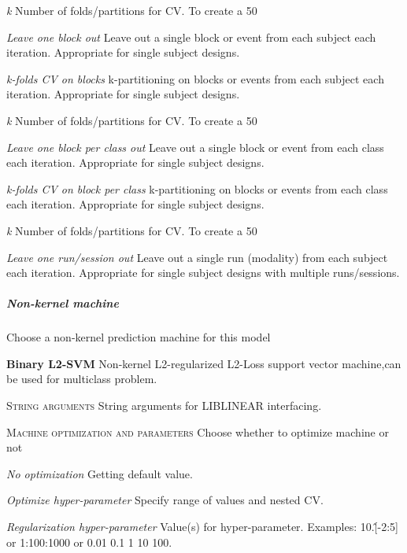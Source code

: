 \textit{k}
Number of folds/partitions for CV. To create a 50%


\textit{Leave one block out}
Leave out a single block or event from each subject each iteration. Appropriate for single subject designs.


\textit{k-folds CV on blocks}
k-partitioning on blocks or events from each subject each iteration. Appropriate for single subject designs.


\textit{k}
Number of folds/partitions for CV. To create a 50%


\textit{Leave one block per class out}
Leave out a single block or event from each class each iteration. Appropriate for single subject designs.


\textit{k-folds CV on block per class}
k-partitioning on blocks or events from each class each iteration. Appropriate for single subject designs.


\textit{k}
Number of folds/partitions for CV. To create a 50%


\textit{Leave one run/session out}
Leave out a single run (modality) from each subject each iteration. Appropriate for single subject designs with multiple runs/sessions.


\subparagraph{Non-kernel machine}
Choose a non-kernel prediction machine for this model


\textbf{Binary L2-SVM}
Non-kernel L2-regularized L2-Loss support vector machine,can be used for multiclass problem.


\textsc{String arguments}
String arguments for LIBLINEAR interfacing.


\textsc{Machine optimization and parameters}
Choose whether to optimize machine or not


\textsl{No optimization}
Getting default value.


\textsl{Optimize hyper-parameter}
Specify range of values and nested CV.


\textit{Regularization hyper-parameter}
Value(s) for hyper-parameter. Examples: 10.\^[-2:5] or 1:100:1000 or 0.01 0.1 1 10 100.


